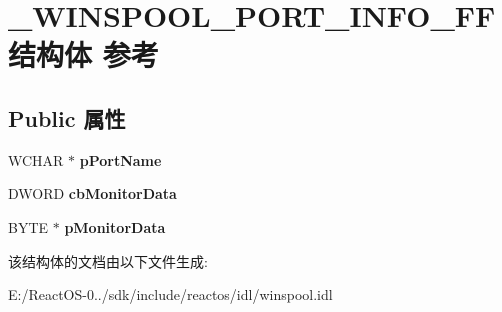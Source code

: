 \hypertarget{struct___w_i_n_s_p_o_o_l___p_o_r_t___i_n_f_o___f_f}{}\section{\+\_\+\+W\+I\+N\+S\+P\+O\+O\+L\+\_\+\+P\+O\+R\+T\+\_\+\+I\+N\+F\+O\+\_\+\+F\+F结构体 参考}
\label{struct___w_i_n_s_p_o_o_l___p_o_r_t___i_n_f_o___f_f}
\subsection*{Public 属性}
\begin{DoxyCompactItemize}
\item 
\mbox{\label{struct___w_i_n_s_p_o_o_l___p_o_r_t___i_n_f_o___f_f_af4216948ed61e8a36d2d4e49bfe87d46}} 
W\+C\+H\+AR $\ast$ {\bfseries p\+Port\+Name}
\item 
\mbox{\label{struct___w_i_n_s_p_o_o_l___p_o_r_t___i_n_f_o___f_f_adb0aee590f5640938815e8f3ffb9c0b9}} 
D\+W\+O\+RD {\bfseries cb\+Monitor\+Data}
\item 
\mbox{\label{struct___w_i_n_s_p_o_o_l___p_o_r_t___i_n_f_o___f_f_acdd2136b3463d97906a59c8e20ea2677}} 
B\+Y\+TE $\ast$ {\bfseries p\+Monitor\+Data}
\end{DoxyCompactItemize}


该结构体的文档由以下文件生成\+:\begin{DoxyCompactItemize}
\item 
E\+:/\+React\+O\+S-\/0../sdk/include/reactos/idl/winspool.\+idl\end{DoxyCompactItemize}
